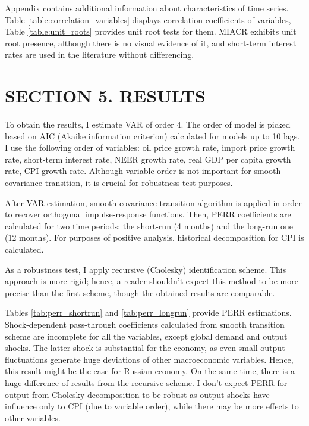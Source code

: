 \documentclass[12pt, a4paper]{extarticle}
\begin{document}
Appendix contains additional information about characteristics of time series. Table \ref{table:correlation_variables} displays correlation coefficients of variables, Table \ref{table:unit_roots} provides unit root tests for them. \mbox{MIACR} exhibits unit root presence, although there is no visual evidence of it, and short-term interest rates are used in the literature without differencing.

\clearpage
\section*{SECTION 5. RESULTS}
\setcounter{section}{4}
\setcounter{subsection}{0}

To obtain the results, I estimate VAR of order 4. The order of model is picked based on AIC (Akaike information criterion) calculated for models up to 10 lags. I use the following order of variables: oil price growth rate, import price growth rate, short-term interest rate, NEER growth rate, real GDP per capita growth rate, CPI growth rate. Although variable order is not important for smooth covariance transition, it is crucial for robustness test purposes. 

After VAR estimation, smooth covariance transition algorithm is applied in order to recover orthogonal impulse-response functions. Then, PERR coefficients are calculated for two time periods: the short-run (4 months) and the long-run one (12 months). For purposes of positive analysis, historical decomposition for CPI is calculated.

As a robustness test, I apply recursive (Cholesky) identification scheme. This approach is more rigid; hence, a reader shouldn't expect this method to be more precise than the first scheme, though the obtained results are comparable.

Tables \ref{tab:perr_shortrun} and \ref{tab:perr_longrun} provide PERR estimations. Shock-dependent pass-through coefficients calculated from smooth transition scheme are incomplete for all the variables, except global demand and output shocks. The latter shock is substantial for the economy, as even small output fluctuations generate huge deviations of other macroeconomic variables. Hence, this result might be the case for Russian economy. On the same time, there is a huge difference of results from the recursive scheme. I don't expect PERR for output from Cholesky decomposition to be robust as output shocks have influence only to CPI (due to variable order), while there may be more effects to other variables.
\end{document}
